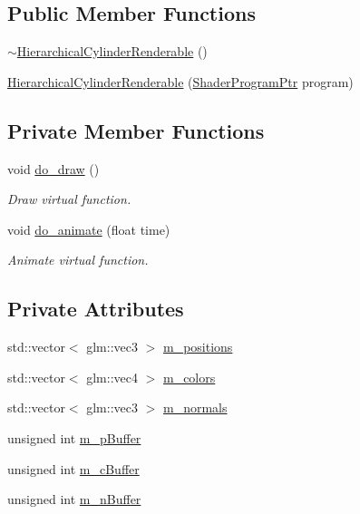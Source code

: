 \subsection*{Public Member Functions}
\begin{DoxyCompactItemize}
\item 
\hyperlink{classHierarchicalCylinderRenderable_a35f2ede6a6f39ff9b770a06ee6dcb73c}{$\sim$\+Hierarchical\+Cylinder\+Renderable} ()
\item 
\hyperlink{classHierarchicalCylinderRenderable_a7c71cab100ac3d2a0d3e25591cc062f0}{Hierarchical\+Cylinder\+Renderable} (\hyperlink{ShaderProgram_8hpp_af8e4af1ad4c53875ee5d32ab7e1f4966}{Shader\+Program\+Ptr} program)
\end{DoxyCompactItemize}
\subsection*{Private Member Functions}
\begin{DoxyCompactItemize}
\item 
void \hyperlink{classHierarchicalCylinderRenderable_a4c2f4ead07f0c700e3b94f961a7be412}{do\+\_\+draw} ()
\begin{DoxyCompactList}\small\item\em Draw virtual function. \end{DoxyCompactList}\item 
void \hyperlink{classHierarchicalCylinderRenderable_a151ed55445a3bbbabdc9d19231a64a52}{do\+\_\+animate} (float time)
\begin{DoxyCompactList}\small\item\em Animate virtual function. \end{DoxyCompactList}\end{DoxyCompactItemize}
\subsection*{Private Attributes}
\begin{DoxyCompactItemize}
\item 
std\+::vector$<$ glm\+::vec3 $>$ \hyperlink{classHierarchicalCylinderRenderable_aa25417073ea90df6ea59d7d87050df49}{m\+\_\+positions}
\item 
std\+::vector$<$ glm\+::vec4 $>$ \hyperlink{classHierarchicalCylinderRenderable_aba8133be058d160bf53a66f205188e0a}{m\+\_\+colors}
\item 
std\+::vector$<$ glm\+::vec3 $>$ \hyperlink{classHierarchicalCylinderRenderable_af38a98b2fe2ca4b179d93b02dbf759fd}{m\+\_\+normals}
\item 
unsigned int \hyperlink{classHierarchicalCylinderRenderable_a7a69b3845a3dd2259b3c23a7c339232b}{m\+\_\+p\+Buffer}
\item 
unsigned int \hyperlink{classHierarchicalCylinderRenderable_a235710905d690d2ac3ee338ff486cf00}{m\+\_\+c\+Buffer}
\item 
unsigned int \hyperlink{classHierarchicalCylinderRenderable_aeede6a6e7c005db3949e90036855b0c5}{m\+\_\+n\+Buffer}
\end{DoxyCompactItemize}
